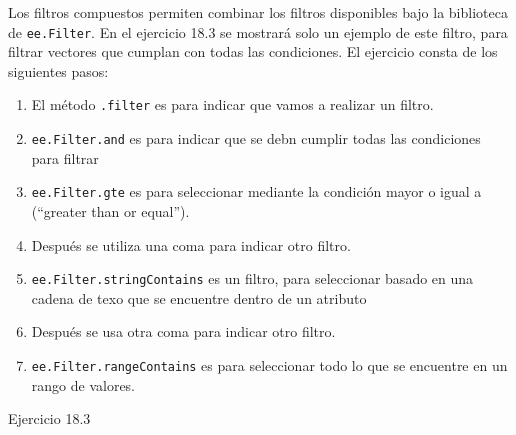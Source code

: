 \documentclass[
  12pt,
  letterpaper,
  twoside]{book}
\providecommand{\tightlist}{%
  \setlength{\itemsep}{0pt}\setlength{\parskip}{0pt}}
\begin{document}
Los filtros compuestos permiten combinar los filtros disponibles bajo la biblioteca de \texttt{ee.Filter}. En el ejercicio 18.3 se mostrará solo un ejemplo de este filtro, para filtrar vectores que cumplan con todas las condiciones. El ejercicio consta de los siguientes pasos:

\begin{enumerate}
\def\labelenumi{\arabic{enumi}.}
\tightlist
\item
  El método \texttt{.filter} es para indicar que vamos a realizar un filtro.
\item
  \texttt{ee.Filter.and} es para indicar que se debn cumplir todas las condiciones para filtrar
\item
  \texttt{ee.Filter.gte} es para seleccionar mediante la condición mayor o igual a (``greater than or equal'').
\item
  Después se utiliza una coma para indicar otro filtro.
\item
  \texttt{ee.Filter.stringContains} es un filtro, para seleccionar basado en una cadena de texo que se encuentre dentro de un atributo
\item
  Después se usa otra coma para indicar otro filtro.
\item
  \texttt{ee.Filter.rangeContains} es para seleccionar todo lo que se encuentre en un rango de valores.
\end{enumerate}

Ejercicio 18.3
\end{document}

